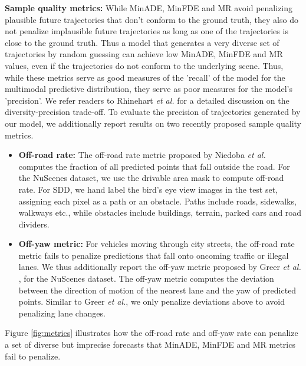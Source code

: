 \documentclass[journal]{IEEEtran}
\begin{document}
\vspace{0.1in}
\noindent\textbf{Sample quality metrics:} While MinADE, MinFDE and MR avoid penalizing plausible future trajectories that don't conform to the ground truth, they also do not penalize implausible future trajectories as long as one of the  trajectories is close to the ground truth. Thus a model that generates a very diverse set of  trajectories by random guessing can achieve low MinADE, MinFDE and MR values, even if the trajectories do not conform to the underlying scene. Thus, while these metrics serve as good measures of the 'recall' of the model for the multimodal predictive distribution, they serve as poor measures for the model's 'precision'. We refer readers to Rhinehart \textit{et al.} \cite{rhinehart2018r2p2} for a detailed discussion on the diversity-precision trade-off. To evaluate the precision of trajectories generated by our model, we additionally report results on two recently proposed sample quality metrics.
\vspace{0.05in}
\begin{itemize}
    \item \textbf{Off-road rate:} The off-road rate metric proposed by Niedoba \textit{et al.} \cite{niedoba2019improving} computes the fraction of all predicted points that fall outside the road. For the NuScenes dataset, we use the drivable area mask to compute off-road rate. For SDD, we hand label the bird's eye view images in the test set, assigning each pixel as a path or an obstacle. Paths include roads, sidewalks, walkways etc., while obstacles include buildings, terrain, parked cars and road dividers. 
    \vspace{0.05in}
    \item \textbf{Off-yaw metric:} For vehicles moving through city streets, the off-road rate metric fails to penalize predictions that fall onto oncoming traffic or illegal lanes. We thus additionally report the off-yaw metric proposed by Greer \textit{et al.} \cite{greer2020trajectory}, for the NuScenes dataset. The off-yaw metric computes the deviation between the direction of motion of the nearest lane and the yaw of predicted points. Similar to Greer \textit{et al.}, we only penalize deviations above  to avoid penalizing lane changes.  
\end{itemize}
\vspace{0.05in}
\noindent Figure \ref{fig:metrics} illustrates how the off-road rate and off-yaw rate can penalize a set of diverse but imprecise forecasts that MinADE, MinFDE and MR metrics fail to penalize. 
\end{document}
